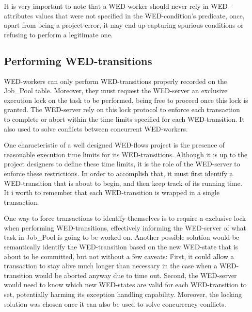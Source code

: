\documentclass[12pt]{article}
\begin{document}
\par It is very important to note that a WED-worker should never rely in WED-attributes values that were not specified in the WED-condition's predicate, once, apart from being a project error, it may end up capturing spurious conditions or refusing to perform a legitimate one.

\subsection{Performing WED-transitions}

WED-workers can only perform WED-transitions properly recorded on the Job\_Pool table. Moreover, they must request the WED-server an exclusive execution lock on the task to be performed, being free to proceed once this lock is granted. The WED-server rely
on this lock protocol to enforce each transaction to complete or abort within the time limits specified for each WED-transition. It also used to solve conflicts between concurrent WED-workers. 

\par One characteristic of a well designed WED-flows project is the presence of reasonable execution time limits for its WED-transitions. Although it is up to the project designers to define these time limits, it is the role of the WED-server to enforce these restrictions.
In order to accomplish that, it must first identify a WED-transition that is about to begin, and then keep track of its running time. It i worth to remember that each WED-transition is wrapped in a single transaction.

\par One way to force transactions to identify themselves is to require a exclusive lock when performing WED-transitions, effectively informing the WED-server of what task in Job\_Pool is going to be worked on. Another possible solution would be semantically identify the WED-transition based on the new WED-state that is about to be committed, but not without a 
few caveats: First, it could allow a transaction to stay alive much longer than necessary in the case when a WED-transition would be aborted anyway due to time out. Second, the WED-server would need to know which new WED-states are valid for each
WED-transition to set, potentially harming its exception handling capability. Moreover, the locking solution was chosen once it can also be used to solve concurrency conflicts.    
\end{document}

